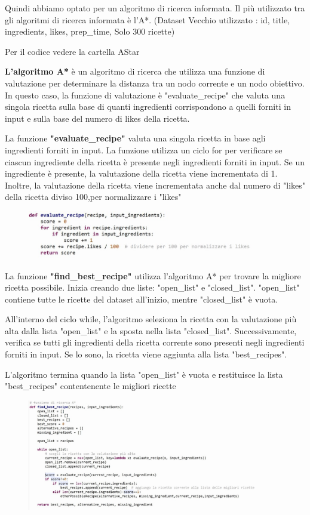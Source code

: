 \documentclass[12pt]{report}
\begin{document}
Quindi abbiamo optato per un algoritmo di ricerca informata. Il più utilizzato tra gli algoritmi di ricerca informata è l’A*. (Dataset Vecchio utilizzato : id, title, ingredients, likes, prep\_time, Solo 300 ricette)

Per il codice vedere la cartella AStar

\textbf{L'algoritmo A*} è un algoritmo di ricerca che utilizza una funzione di valutazione per determinare la distanza tra un nodo corrente e un nodo obiettivo. In questo caso, la funzione di valutazione è "evaluate\_recipe" che valuta una singola ricetta sulla base di quanti ingredienti corrispondono a quelli forniti in input e sulla base del numero di likes della ricetta.

La funzione \textbf{"evaluate\_recipe"} valuta una singola ricetta in base agli ingredienti forniti in input. La funzione utilizza un ciclo for per verificare se ciascun ingrediente della ricetta è presente negli ingredienti forniti in input. Se un ingrediente è presente, la valutazione della ricetta viene incrementata di 1. Inoltre, la valutazione della ricetta viene incrementata anche dal numero di "likes" della ricetta diviso 100,per normalizzare i "likes"
\begin{figure}[H]
        \centering
        {\includegraphics[width=0.9\textwidth]{img/img10.jpg}}
\end{figure}

La funzione \textbf{"find\_best\_recipe"} utilizza l'algoritmo A* per trovare la migliore ricetta possibile. Inizia creando due liste: "open\_list" e "closed\_list". "open\_list" contiene tutte le ricette del dataset all'inizio, mentre "closed\_list" è vuota.

All'interno del ciclo while, l'algoritmo seleziona la ricetta con la valutazione più alta dalla lista "open\_list" e la sposta nella lista "closed\_list". Successivamente, verifica se tutti gli ingredienti della ricetta corrente sono presenti negli ingredienti forniti in input. Se lo sono, la ricetta viene aggiunta alla lista "best\_recipes".

L'algoritmo termina quando la lista "open\_list" è vuota e restituisce la lista "best\_recipes" contentenente le migliori ricette
\begin{figure}[H]
        \centering
        {\includegraphics[width=0.9\textwidth]{img/img11.jpg}}
\end{figure}
\end{document}
